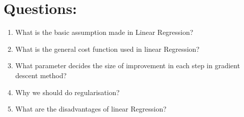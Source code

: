 \documentclass[journal,12pt,onecolumn]{IEEEtran}
\theoremstyle{remark}
\numberwithin{equation}{section}
\begin{document}
 \section{Questions:}
   \begin{enumerate}
     \item What is the basic assumption made in Linear Regression?
     \item What is the general cost function used in linear Regression?
     \item What parameter decides the size of improvement in each step in gradient descent method?
     \item Why we should do regularisation?
     \item What are the disadvantages of linear Regression?	
    \end{enumerate}     
\end{document}
